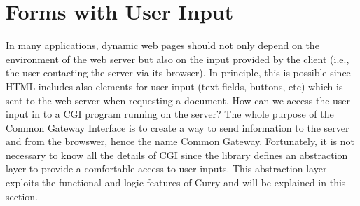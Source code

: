 \section{Forms with User Input}
\label{sec-html-forms}

In many applications, dynamic web pages should not only depend
on the environment of the web server but also on the input
provided by the client (i.e., the user contacting the server
via its browser). In principle, this is possible since
HTML includes also elements for user input (text fields, buttons, etc)
which is sent to the web server when requesting a document.
How can we access the user input in to a CGI program running on
the server? The whole purpose of the Common Gateway Interface is to create a way to send information to the server and from the browswer, hence the name Common Gateway.  Fortunately, it is not necessary to know all the details of
CGI since the  library defines an abstraction layer
to provide a comfortable access to user inputs.
This abstraction layer exploits the functional and logic features
of Curry and will be explained in this section.


